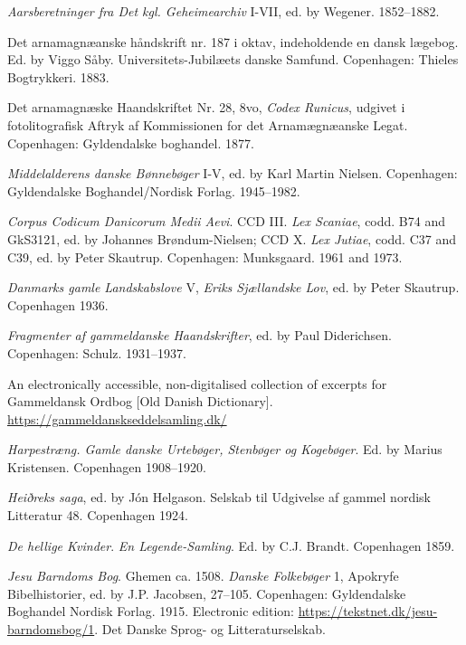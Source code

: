 \documentclass[output=paper]{langscibook}
\begin{document}
\begin{description}[font=\normalfont]\sloppy
\item[AarsberGeh:]   \textit{Aarsberetninger fra Det kgl. Geheimearchiv} I-VII, ed. by Wegener. 1852--1882.
\item[AM 187, 8\textsuperscript{o}:] Det arnamagnæanske håndskrift nr. 187 i oktav, indeholdende en dansk lægebog. Ed. by Viggo Såby. Universitets-Jubilæets danske Samfund. Copenhagen: Thieles Bogtrykkeri. 1883.
\item[AM 28, 8\textsuperscript{o}:]  Det arnamagnæske Haandskriftet Nr. 28, 8vo, \textit{Codex Runicus}, udgivet i fotolitografisk Aftryk af Kommissionen for det Arnamægnæanske Legat. Copenhagen: Gyldendalske boghandel. 1877.
\item[Bønneb:] \textit{Middelalderens danske Bønnebøger} I-V, ed. by Karl Martin Nielsen. Copenhagen: Gyldendalske Boghandel/Nordisk Forlag. 1945--1982.
\item[CCD:]   \textit{Corpus Codicum Danicorum Medii Aevi}. CCD III. \textit{Lex Scaniae}, codd. B74 and GkS3121, ed. by Johannes Brøndum-Nielsen; CCD X. \textit{Lex Jutiae}, codd. C37 and C39, ed. by Peter Skautrup. Copenhagen: Munksgaard. 1961 and 1973.
\item[DgL V:]  \textit{Danmarks gamle Landskabslove} V, \textit{Eriks Sjællandske Lov}, ed. by Peter Skautrup. Copenhagen 1936.
\item[Fragm:]  \textit{Fragmenter af gammeldanske Haandskrifter}, ed. by Paul Diderichsen. Copenhagen: Schulz. 1931--1937.
\item[GldO:]  An electronically accessible, non-digitalised collection of excerpts for Gammeldansk Ordbog [Old Danish Dictionary]. \url{https://gammeldanskseddelsamling.dk/}
\item[Harpestreng:]  \textit{Harpestræng. Gamle danske Urtebøger, Stenbøger og Kogebøger}. Ed. by Marius Kristensen. Copenhagen 1908--1920.
\item[\textit{HeiðrR}:]  \textit{Heiðreks saga}, ed. by Jón Helgason. Selskab til Udgivelse af gammel nordisk Litteratur 48. Copenhagen 1924.
\item[HellKv:]  \textit{De hellige Kvinder}. \textit{En Legende-Samling}. Ed. by C.J. Brandt. Copenhagen 1859.
\item[JBB:]  \textit{Jesu Barndoms Bog}. Ghemen ca. 1508. \textit{Danske Folkebøger} 1, Apokryfe Bibelhistorier, ed. by J.P. Jacobsen, 27--105. Copenhagen: Gyldendalske Boghandel Nordisk Forlag. 1915. Electronic edition: \url{https://tekstnet.dk/jesu-barndomsbog/1}.  Det Danske Sprog- og Litteraturselskab.

\end{description}
\end{document}
